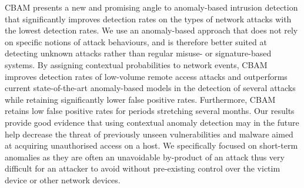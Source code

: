 CBAM presents a new and promising angle to anomaly-based intrusion detection that significantly improves detection rates on the types of network attacks with the lowest detection rates. We use an anomaly-based approach that does not rely on specific notions of attack behaviours, and is therefore better suited at detecting unknown attacks rather than regular misuse- or signature-based systems. By assigning contextual probabilities to network events, CBAM improves detection rates of low-volume remote access attacks and outperforms current state-of-the-art anomaly-based models in the detection of several attacks while retaining significantly lower false positive rates. Furthermore, CBAM retains low false positive rates for periods stretching several months. Our results provide good evidence that using contextual anomaly detection may in the future help decrease the threat of previously unseen vulnerabilities and malware aimed at acquiring unauthorised access on a host. We specifically focused on short-term anomalies as they are often an unavoidable by-product of an attack thus very difficult for an attacker to avoid without pre-existing control over the victim device or other network devices.



